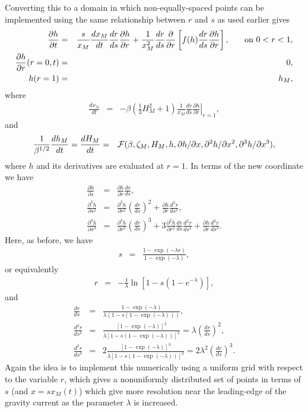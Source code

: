 \documentclass[11pt]{article}
\newcommand{\bea}{\begin{eqnarray}}
\newcommand{\eea}{\end{eqnarray}}
\begin{document}
Converting this to a domain in which non-equally-spaced points can be implemented using the same relationship between $r$ and $s$ as used earlier gives
\bea
\label{eq:outer_h_fixed_domain_drds_v2}
\frac{\partial h}{\partial t} & = & \frac{s}{x_M} \frac{dx_M}{dt} \frac{dr}{ds} \frac{\partial h}{\partial r} + \frac{1}{x_M^2} \frac{dr}{ds} \frac{\partial}{\partial r} 
\left[ f(h) \frac{dr}{ds} \frac{\partial h}{\partial r} \right], \hspace{0.25in} \mbox{on $0 < r < 1$},\\
\label{eq:outer_bc1_fixed_domain_drds_v2}
\frac{\partial h}{\partial r}(r=0,t) & = & 0,\\
\label{eq:outer_bc2_fixed_domain_drds_v2}
h(r=1) & = & h_M,
\eea
where
\bea
\label{eq:outer_bc3_fixed_domain_drds_v2}
\frac{dx_N}{dt} & = & - \beta \left( \frac{1}{3} H^2_M + 1 \right)  \frac{1}{x_M} \frac{dr}{ds} \left. \frac{\partial h}{\partial r} \right|_{r=1},
\eea
and 
\bea
\label{eq:outer_bc_hm_ode_drds}
\frac{1}{\beta^{1/2}} \frac{dh_M}{dt} = \frac{dH_M}{dt} & = & {\cal F}(\beta,\zeta_M,H_M,h,\partial h/\partial x, \partial^2 h/\partial x^2 , \partial^3 h/\partial x^3),
\eea
where $h$ and its derivatives are evaluated at $r=1$.  In terms of the new coordinate we have 
\bea
\frac{\partial h}{\partial s} & = & \frac{\partial h}{\partial r} \frac{dr}{ds}, \\
\frac{\partial^2 h}{\partial s^2} & = & \frac{\partial^2 h}{\partial r^2} \left( \frac{dr}{ds} \right)^2 + \frac{\partial h}{\partial r} \frac{d^2r}{ds^2},\\
\frac{\partial^3 h}{\partial s^3} & = & \frac{\partial^3 h}{\partial r^3} \left( \frac{dr}{ds} \right)^3 + 3 \frac{\partial^2 h}{\partial r^2} \frac{dr}{ds} \frac{d^2 r}{ds^2} + \frac{\partial h}{\partial r} \frac{d^3r}{ds^3}.
\eea
{\color{red}{Double-check these!}}
Here, as before, we have
\bea
s & = & \frac{1- \exp (-\lambda r)}{1 - \exp (-\lambda)},
\eea
or equivalently
\bea
r & = & - \frac{1}{\lambda} \ln \left[ 1 - s (1-e^{-\lambda}) \right],
\eea
and
\bea
\frac{dr}{ds} & = & \frac{ 1 - \exp(-\lambda) } {\lambda  (1 - s(1 - \exp(-\lambda)))},\\
\frac{d^2r}{ds^2} & = &  \frac{ [1 - \exp(-\lambda) ]^2} {\lambda  [1 - s(1 - \exp(-\lambda))]^2} = \lambda \left( \frac{dr}{ds} \right)^2,\\
\frac{d^3r}{ds^3} & = &  2 \frac{ [1 - \exp(-\lambda) ]^3} {\lambda  [1 - s(1 - \exp(-\lambda))]^3} = 2\lambda^2 \left( \frac{dr}{ds} \right)^3.
\eea
Again the idea is to implement this numerically using a uniform grid with respect to the variable $r$, which gives a nonuniformly distributed set of points in terms of
$s$ (and $x= s x_M(t)$) which give more resolution near the leading-edge of the gravity current as the parameter $\lambda$ is increased.  
\end{document}
